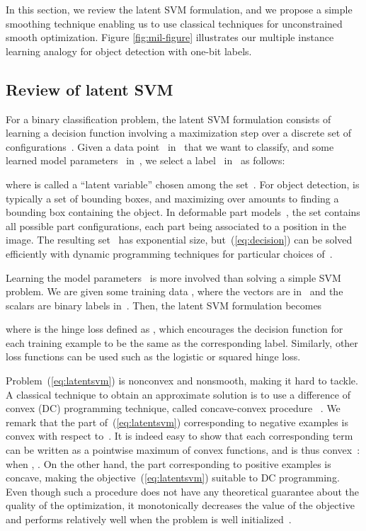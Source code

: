 \documentclass{article}
\begin{document}
In this section, we review the latent SVM formulation, and we propose a simple
smoothing technique enabling us to use classical techniques for unconstrained
smooth optimization. Figure \ref{fig:mil-figure} illustrates our multiple
instance learning analogy for object detection with one-bit labels.

\subsection{Review of latent SVM}

For a binary classification problem, the latent SVM formulation consists of
learning a decision function involving a maximization step over a discrete set of 
configurations~. Given a data point~ in~ that we
want to classify, and some learned model parameters~ in~, 
we select a label~ in~ as follows:

where  is called a ``latent variable'' chosen among the set~. For
object detection,  is typically a set of bounding boxes, and maximizing
over  amounts to finding a bounding box containing the object.  In
deformable part models~\cite{lsvm-pami}, the set  contains all possible
part configurations, each part being associated to a position in the image.
The resulting set~ has exponential size, but~(\ref{eq:decision}) can be
solved efficiently with dynamic programming techniques for particular choices of~.

Learning the model parameters~ is more involved than solving a simple SVM
problem. We are given some training data , where the 
vectors  are  in~ and the scalars  are binary labels in~. Then, the latent SVM formulation becomes
\vspace{-4pt}

where  is the hinge loss defined as
, which encourages the decision
function for each training example to be the same as the corresponding label.
Similarly, other loss functions can be used such as the logistic or
squared hinge loss.

Problem~(\ref{eq:latentsvm}) is nonconvex and nonsmooth, making it hard to
tackle. A classical technique to obtain an approximate solution is to
use a difference of convex (DC) programming technique, called concave-convex
procedure ~\cite{yuille_cccp,Yu09}.  
We remark that the part of~(\ref{eq:latentsvm}) corresponding to negative
examples is convex with respect to~. It is indeed easy to show that each corresponding term can
be written as a pointwise maximum of convex functions, and is thus
convex~\citep[see][]{boyd}: when , .  On the other hand, the part corresponding to positive
examples is concave, making the objective~(\ref{eq:latentsvm}) suitable
to DC programming. Even though such a procedure does not have any
theoretical guarantee about the quality of the optimization, it monotonically
decreases the value of the objective and performs relatively well when the
problem is well initialized~\cite{lsvm-pami}.
\end{document}
